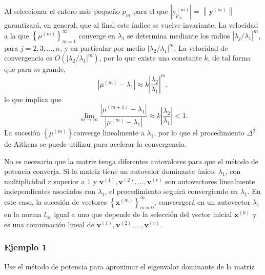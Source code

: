 \documentclass{report}
\numberwithin{subsection}{section} %
\begin{document}
Al seleccionar el entero más pequeño $p_{m}$ para el que $\left| \text{y}_{p_{m}}^{\left( m \right)} \right| = \left\| \textbf{y}^{\left( m \right)} \right\|$ garantizará, en general, que al final este índice se vuelve invariante. La velocidad a la que $\left\{ \mu^{\left( m \right)} \right\}_{m=1}^{\infty }$ converge en $\lambda_{1}$ se determina mediante los radios $\left| \lambda_{j} / \lambda_{1} \right|^{m}$, para $j = 2, 3, ..., n$, y en particular por medio $\left| \lambda_{2} / \lambda_{1} \right|^{m}$. La velocidad de convergencia es $O\left( \left| \lambda_{2} / \lambda_{1} \right|^{m} \right)$, por lo que existe una constante $k$, de tal forma que para $m$ grande,
\begin{equation*}
\left| \mu^{\left( m \right)} - \lambda_{1} \right| \approx k\left| \frac{\lambda_{2}}{\lambda_{1}} \right|^{m},
\end{equation*}
lo que implica que
\begin{equation*}
\lim_{m \to \infty} \frac{\left| \mu^{\left( m + 1 \right)} - \lambda_{1} \right|}{\left| \mu^{\left( m \right)} - \lambda_{1} \right|}  \approx k\left| \frac{\lambda_{2}}{\lambda_{1}} \right| < 1.
\end{equation*}
La sucesión $\left\{ \mu^{\left( m \right)} \right\}$converge linealmente a $\lambda_{1}$, por lo que el procedimiento $\Delta ^{2}$ de Aitkens se puede utilizar para acelerar la convergencia.

No es necesario que la matriz tenga diferentes autovalores para que el método de potencia converja. Si la matriz tiene un autovalor dominante único, $\lambda_{1}$, con multiplicidad $r$ superior a $1$ y $\textbf{v}^{\left( 1 \right)}, \textbf{v}^{\left( 2 \right)}, ..., \textbf{v}^{\left( r \right)}$ son autovectores linealmente independientes asociados con $\lambda_{1}$, el procedimiento seguirá convergiendo en $\lambda_{1}$. En este caso, la sucesión de vectores $\left\{ \textbf{x}^{\left( m \right)} \right\}_{m=0}^{\infty}$, conveergerá en un autovector $\lambda_{1}$ en la norma $l_{\infty}$ igual a uno que depende de la selección del vector inicial $\textbf{x}^{\left( 0 \right)}$ y es una comninación lineal de $\textbf{v}^{\left( 1 \right)}, \textbf{v}^{\left( 2 \right)}, ..., \textbf{v}^{\left( r \right)}$.

\subsubsection*{Ejemplo 1}

Use el método de potencia para aproximar el eigenvalor dominante de la matriz
\end{document}
